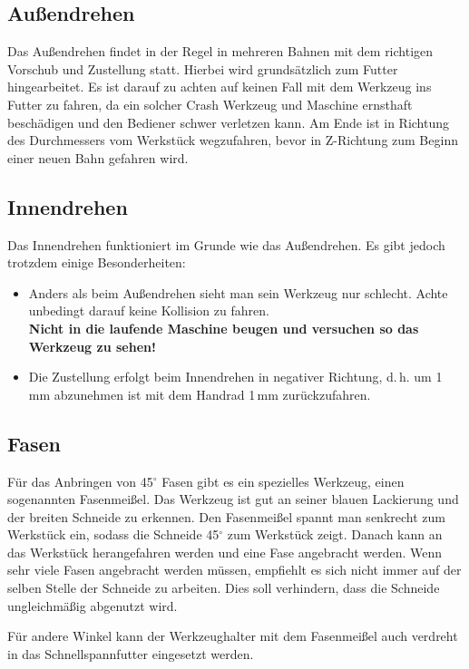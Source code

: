 \documentclass{\basedir/fablab-document}
\begin{document}
\subsection{Außendrehen} 

Das Außendrehen findet in der Regel in mehreren Bahnen mit dem richtigen Vorschub und Zustellung statt.
Hierbei wird grundsätzlich zum Futter hingearbeitet.
Es ist darauf zu achten auf keinen Fall mit dem Werkzeug ins Futter zu fahren, da ein solcher Crash Werkzeug und Maschine ernsthaft beschädigen und den Bediener schwer verletzen kann.
Am Ende ist in Richtung des Durchmessers vom Werkstück wegzufahren, bevor in Z-Richtung zum Beginn einer neuen Bahn gefahren wird.

\subsection{Innendrehen}

Das Innendrehen funktioniert im Grunde wie das Außendrehen. Es gibt jedoch trotzdem einige Besonderheiten:
\begin{itemize}
\item Anders als beim Außendrehen sieht man sein Werkzeug nur schlecht. Achte unbedingt darauf keine Kollision zu fahren.\\
\textbf{Nicht in die laufende Maschine beugen und versuchen so das Werkzeug zu sehen!}
\item Die Zustellung erfolgt beim Innendrehen in negativer Richtung, d.\,h. um 1\,mm abzunehmen ist mit dem Handrad 1\,mm zurückzufahren.
\end{itemize}

\subsection{Fasen}

Für das Anbringen von 45$^\circ$ Fasen gibt es ein spezielles Werkzeug, einen sogenannten Fasenmeißel.
Das Werkzeug ist gut an seiner blauen Lackierung und der breiten Schneide zu erkennen. 
Den Fasenmeißel spannt man senkrecht zum Werkstück ein, sodass die Schneide 45$^\circ$ zum Werkstück zeigt.
Danach kann an das Werkstück herangefahren werden und eine Fase angebracht werden.
Wenn sehr viele Fasen angebracht werden müssen, empfiehlt es sich nicht immer auf der selben Stelle der Schneide zu arbeiten.
Dies soll verhindern, dass die Schneide ungleichmäßig abgenutzt wird.

Für andere Winkel kann der Werkzeughalter mit dem Fasenmeißel auch verdreht in das Schnellspannfutter eingesetzt werden.
\end{document}
